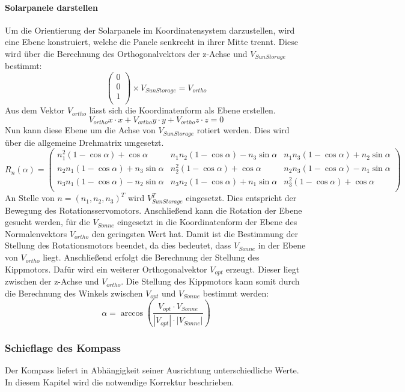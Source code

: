 \paragraph{Solarpanele darstellen}
Um die Orientierung der Solarpanele im Koordinatensystem darzustellen, wird eine Ebene konstruiert, welche die Panele senkrecht in ihrer Mitte trennt.
Diese wird über die Berechnung des Orthogonalvektors der z-Achse und $ V_{SunStorage} $ bestimmt:
\[
\begin{pmatrix}
    0\\
    0\\
    1\\
\end{pmatrix}
\times
V_{SunStorage}
=
V_{ortho}
\]
Aus dem Vektor $ V_{ortho} $ lässt sich die Koordinatenform als Ebene erstellen.
\[V_{ortho}x \cdot x + V_{ortho}y \cdot y + V_{ortho}z \cdot z = 0\] 
Nun kann diese Ebene um die Achse von $ V_{SunStorage} $ rotiert werden.
Dies wird über die allgemeine Drehmatrix umgesetzt.
\[
R_n(\alpha)
=
\begin{pmatrix}
    n^2_1(1-\cos\alpha)+\cos\alpha & n_1n_2(1-\cos \alpha)-n_3\sin\alpha & n_1n_3(1-\cos\alpha)+n_2\sin\alpha\\
    n_2n_1(1-\cos\alpha)+n_3\sin\alpha & n^2_2(1-\cos\alpha)+\cos\alpha & n_2n_3(1-\cos\alpha)-n_1\sin\alpha\\
    n_3n_1(1-\cos\alpha)-n_2\sin\alpha & n_3n_2(1-\cos\alpha)+n_1\sin\alpha & n^2_3(1-\cos\alpha)+\cos\alpha\\
\end{pmatrix}    
\]
An Stelle von $ n = (n_1, n_2, n_3)^T $ wird $ V_{SunStorage}^T $ eingesetzt.
Dies entspricht der Bewegung des Rotationsservomotors.
Anschließend kann die Rotation der Ebene gesucht werden, für die $ V_{Sonne} $ eingesetzt
in  die Koordinatenform der Ebene des Normalenvektors $ V_{ortho} $ den geringsten Wert hat. %
Damit ist die Bestimmung der Stellung des Rotationsmotors beendet, da dies bedeutet, 
dass $ V_{Sonne} $ in der Ebene von  $ V_{ortho} $ liegt.
Anschließend erfolgt die Berechnung der Stellung des Kippmotors.
Dafür wird ein weiterer Orthogonalvektor $ V_{opt} $ erzeugt. 
Dieser liegt zwischen der z-Achse und $ V_{ortho} $. 
Die Stellung des Kippmotors kann somit durch die Berechnung des Winkels zwischen $ V_{opt} $ und $ V_{Sonne} $ bestimmt werden:
\[\alpha = \arccos(\frac{V_{opt} \cdot V_{Sonne}}{\left| V_{opt} \right| \cdot \left| V_{Sonne} \right|})\]

\subsubsection{Schieflage des Kompass}
Der Kompass liefert in Abhängigkeit seiner Ausrichtung unterschiedliche Werte.
In diesem Kapitel wird die notwendige Korrektur beschrieben.
